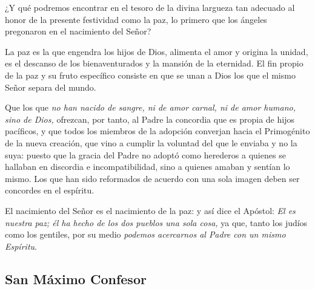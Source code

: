 \begin{body}
				¿Y qué podremos encontrar en el tesoro de la divina largueza tan adecuado al honor de la presente festividad como la paz, lo primero que los ángeles pregonaron en el nacimiento del Señor?
				
				La paz es la que engendra los hijos de Dios, alimenta el amor y origina la unidad, es el descanso de los bienaventurados y la mansión de la eternidad. El fin propio de la paz y su fruto específico consiste en que se unan a Dios los que el mismo Señor separa del mundo.
				
				Que los que \emph{no han nacido de sangre, ni de amor carnal, ni de amor humano, sino de Dios,} ofrezcan, por tanto, al Padre la concordia que es propia de hijos pacíficos, y que todos los miembros de la adopción converjan hacia el Primogénito de la nueva creación, que vino a cumplir la voluntad del que le enviaba y no la suya: puesto que la gracia del Padre no adoptó como herederos a quienes se hallaban en discordia e incompatibilidad, sino a quienes amaban y sentían lo mismo. Los que han sido reformados de acuerdo con una sola imagen deben ser concordes en el espíritu.
				
				El nacimiento del Señor es el nacimiento de la paz: y así dice el Apóstol: \emph{El es nuestra paz; él ha hecho de los dos pueblos una sola cosa,} ya que, tanto los judíos como los gentiles, por su medio \emph{podemos acercarnos al Padre con un mismo Espíritu}.
			\end{body}

\newsection

		\subsection{San Máximo Confesor}
		
			
			
